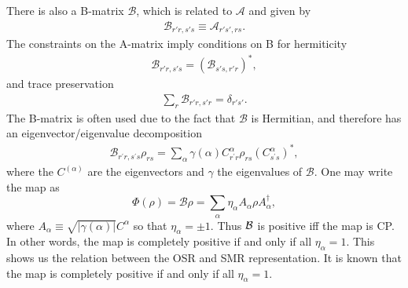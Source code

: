 \documentclass[12pt]{iopart}
\begin{document}
There is also a B-matrix $\mathcal{B}$, which is related to $\mathcal{A}$ and given by
\begin{align}
    \mathcal{B}_{r'r,s's}\equiv\mathcal{A}_{r's',rs}.
\end{align}
The constraints on the A-matrix imply conditions on B for hermiticity
\begin{align}
    \mathcal{B}_{r'r,s's}=(\mathcal{B}_{s's,r'r})^*,
\end{align}
and trace preservation
\begin{align}
    \sum_r \mathcal{B}_{r'r,s'r}=\delta_{r's'}.
\end{align}
The B-matrix is often used due to the fact that $\mathcal{B}$ is Hermitian, and therefore has an eigenvector/eigenvalue decomposition
\begin{align}
    \mathcal{B}_{r^\prime r, s^\prime s} \rho_{rs}= \sum_{\alpha} \gamma(\alpha) C^\alpha_{r^\prime r}\rho_{rs} (C^\alpha_{s^\prime s})^*,
\end{align}
where the $C^{(\alpha)}$ are the eigenvectors and $\gamma$ the eigenvalues of $\mathcal{B}$. One may write the map as
\begin{equation}\label{Bmap}
    \Phi(\rho) = \mathcal{B} \rho = \sum_\alpha \eta_\alpha A_\alpha \rho A_\alpha^\dagger,
\end{equation}
where $A_\alpha \equiv \sqrt{|\gamma(\alpha)|}C^\alpha$ so that $\eta_\alpha = \pm 1$.  Thus ${\cal B}$ is positive iff the map is CP.   In other words, the map is completely positive if and only if all $\eta_\alpha=1$. This shows us the relation between the OSR and SMR representation. It is known that the map is completely positive if and only if all $\eta_\alpha=1$.   
\end{document}
